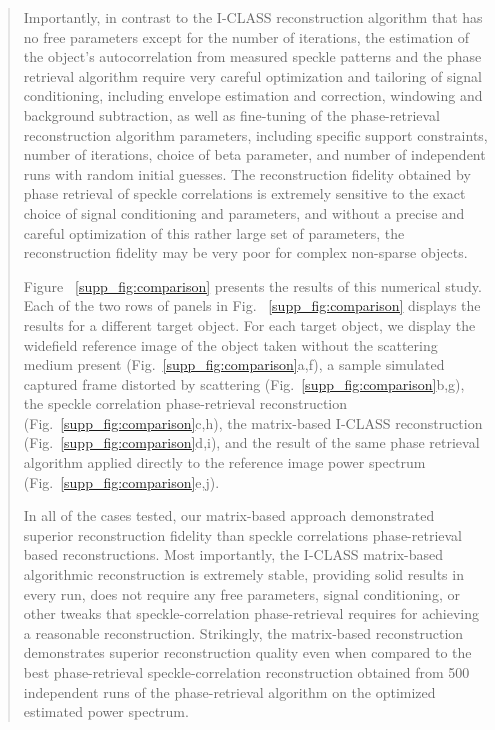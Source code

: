 \documentclass[12pt]{article}
\newenvironment{finished_ourresponse}
    {\begin{tcolorbox}[width=\linewidth,breakable,enhanced,colback=gray!5,colframe=finished_responsecolor!50,title=Response,left=5pt,right=5pt]}
    {\end{tcolorbox}}
\begin{document}
\begin{finished_ourresponse}
\begin{quote}
{        Importantly, in contrast to the I-CLASS reconstruction algorithm that has no free parameters except for the number of iterations, the estimation of the object's autocorrelation from measured speckle patterns and the phase retrieval algorithm require very careful optimization and tailoring of signal conditioning, including envelope estimation and correction, windowing and background subtraction, as well as fine-tuning of the phase-retrieval reconstruction algorithm parameters, including specific support constraints, number of iterations, choice of beta parameter, and number of independent runs with random initial guesses. The reconstruction fidelity obtained by phase retrieval of speckle correlations is extremely sensitive to the exact choice of signal conditioning and parameters, and without a precise and careful optimization of this rather large set of parameters, the reconstruction fidelity may be very poor for complex non-sparse objects. 

        Figure ~\ref{supp_fig:comparison} presents the results of this numerical study. Each of the two rows of panels in Fig. ~\ref{supp_fig:comparison} displays the results for a different target object.  For each target object, we display the widefield reference image of the object taken without the scattering medium present (Fig.~\ref{supp_fig:comparison}a,f), a sample simulated captured frame distorted by scattering (Fig.~\ref{supp_fig:comparison}b,g), the speckle correlation phase-retrieval reconstruction (Fig.~\ref{supp_fig:comparison}c,h), the matrix-based I-CLASS reconstruction (Fig.~\ref{supp_fig:comparison}d,i), and the result of the same phase retrieval algorithm applied directly to the reference image power spectrum (Fig.~\ref{supp_fig:comparison}e,j).
        
        In all of the cases tested, our matrix-based approach demonstrated superior reconstruction fidelity than speckle correlations phase-retrieval based reconstructions. Most importantly, the I-CLASS matrix-based algorithmic reconstruction is extremely stable, providing solid results in every run, does not require any free parameters, signal conditioning, or other tweaks that speckle-correlation phase-retrieval requires for achieving a reasonable reconstruction. Strikingly, the matrix-based reconstruction demonstrates superior reconstruction quality even when compared to the best phase-retrieval speckle-correlation reconstruction obtained from 500 independent runs of the phase-retrieval algorithm on the optimized estimated power spectrum.

}
\end{quote}
\end{finished_ourresponse}
\end{document}

